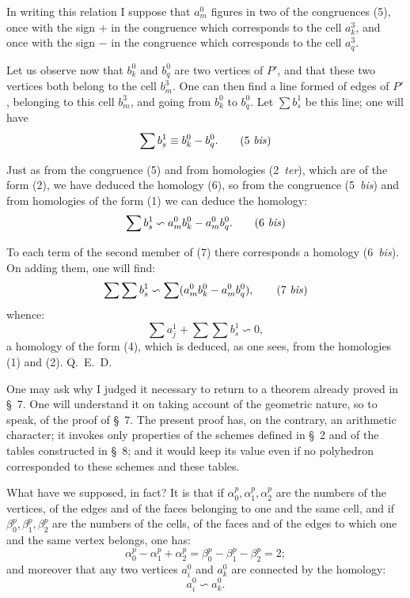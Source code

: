 \documentclass{article}
\begin{document}
In writing this relation I suppose that $a^{0}_{m}$ figures in two of the congruences (5), once with the sign $+$ in the congruence which corresponds to the cell $a^{3}_{k}$, and once with the sign $-$ in the congruence which corresponds to the cell $a^{3}_{q}$.

Let us observe now that $b^{0}_{k}$ and $b^{0}_{q}$ are two vertices of $P'$, and that these two vertices both belong to the cell $b^{3}_{m}$. One can then find a line formed of edges of $P'$, belonging to this cell $b^{3}_{m}$, and going from $b^{0}_{k}$ to $b^{0}_{q}$. Let $\displaystyle\sum b^{1}_{s}$ be this line; one will have
\[ \sum b^{1}_{s} \equiv b^{0}_{k} - b^{0}_{q}. \tag{5 \textit{bis}} \]


Just as from the congruence (5) and from homologies (2~\emph{ter}), which are of the form (2), we have deduced the homology (6), so from the congruence (5~\emph{bis}) and from homologies of the form (1) we can deduce the homology:
\[ \sum b^{1}_{s} \backsim a^{0}_{m} b^{0}_{k} - a^{0}_{m} b^{0}_{q}. \tag{6 \textit{bis}} \]

To each term of the second member of (7) there corresponds a homology (6~\emph{bis}). On adding them, one will find:
\[ \sum \sum b^{1}_{s} \backsim \sum (a^{0}_{m} b^{0}_{k} - a^{0}_{m} b^{0}_{q}), \tag{7 \textit{bis}} \]
whence:
\[ \sum a^{1}_{j} + \sum \sum b^{1}_{s} \backsim 0, \tag{8} \]
a homology of the form (4), which is deduced, as one sees, from the homologies (1) and (2). Q.~E.~D.

One may ask why I judged it necessary to return to a theorem already proved in \S~7. One will understand it on taking account of the geometric nature, so to speak, of the proof of \S~7. The present proof has, on the contrary, an arithmetic character; it invokes only properties of the schemes defined in \S~2 and of the tables constructed in \S~8; and it would keep its value even if no polyhedron corresponded to these schemes and these tables.

What have we supposed, in fact? It is that if $\alpha^{p}_{0}, \alpha^{p}_{1}, \alpha^{p}_{2}$ are the numbers of the vertices, of the edges and of the faces belonging to one and the same cell, and if $\beta^{p}_{0}, \beta^{p}_{1}, \beta^{p}_{2}$ are the numbers of the cells, of the faces and of the edges to which one and the same vertex belongs, one has:
\[ \alpha^{p}_{0} - \alpha^{p}_{1} + \alpha^{p}_{2} = \beta^{p}_{0} - \beta^{p}_{1} - \beta^{p}_{2} = 2; \]
and moreover that any two vertices $a^{0}_{i}$ and $a^{0}_{k}$ are connected by the homology:
\[ a^{0}_{i} \backsim a^{0}_{k}. \tag{9} \]
\end{document}
